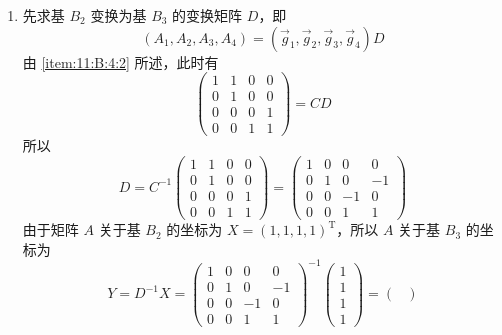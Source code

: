 \documentclass[UTF8,12pt,a4paper,fontset=fandol]{ctexart}
\begin{document}
\begin{solve}
\begin{enumerate}
                \item 先求基 $ B_2 $ 变换为基 $ B_3 $ 的变换矩阵 $ D $，即
                      \[ (A_1, A_2, A_3, A_4) = (\vec{g}_1, \vec{g}_2, \vec{g}_3, \vec{g}_4) D \]
                      由 \eqref{item:11:B:4:2} 所述，此时有
                      \[ \begin{pmatrix}
                              1 & 1 & 0 & 0 \\
                              0 & 1 & 0 & 0 \\
                              0 & 0 & 0 & 1 \\
                              0 & 0 & 1 & 1
                          \end{pmatrix} = CD \]
                      所以
                      \[ D = C^{-1} \begin{pmatrix}
                              1 & 1 & 0 & 0 \\
                              0 & 1 & 0 & 0 \\
                              0 & 0 & 0 & 1 \\
                              0 & 0 & 1 & 1
                          \end{pmatrix} = \begin{pmatrix}
                              1 & 0 & 0  & 0  \\
                              0 & 1 & 0  & -1 \\
                              0 & 0 & -1 & 0  \\
                              0 & 0 & 1  & 1
                          \end{pmatrix} \]
                      由于矩阵 $ A $ 关于基 $ B_2 $ 的坐标为 $ X = (1, 1, 1, 1)^{\mathrm{T}} $，所以 $ A $ 关于基 $ B_3 $ 的坐标为
                      \[ Y = D^{-1} X = \begin{pmatrix}
                              1 & 0 & 0  & 0  \\
                              0 & 1 & 0  & -1 \\
                              0 & 0 & -1 & 0  \\
                              0 & 0 & 1  & 1
                          \end{pmatrix}^{-1} \begin{pmatrix} 1 \\ 1 \\ 1 \\ 1 \end{pmatrix} = \begin{pmatrix}

\end{pmatrix}\]
\end{enumerate}
\end{solve}
\end{document}
